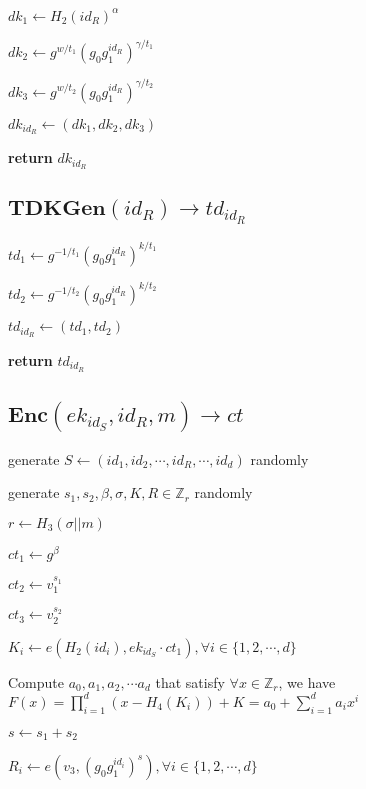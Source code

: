 \documentclass[a4paper]{article}
\begin{document}
$\textit{dk}_1 \gets H_2(\textit{id}_R)^\alpha$

$\textit{dk}_2 \gets g^{w / t_1} (g_0 g_1^{\textit{id}_R})^{\gamma / t_1}$

$\textit{dk}_3 \gets g^{w / t_2} (g_0 g_1^{\textit{id}_R})^{\gamma / t_2}$

$\textit{dk}_{\textit{id}_R} \gets (\textit{dk}_1, \textit{dk}_2, \textit{dk}_3)$

\textbf{return} $\textit{dk}_{\textit{id}_R}$

\subsection{$\textbf{TDKGen}(\textit{id}_R) \rightarrow \textit{td}_{\textit{id}_R}$}

$\textit{td}_1 \gets g^{-1 / t_1} (g_0 g_1^{\textit{id}_R})^{k / t_1}$

$\textit{td}_2 \gets g^{-1 / t_2} (g_0 g_1^{\textit{id}_R})^{k / t_2}$

$\textit{td}_{\textit{id}_R} \gets (\textit{td}_1, \textit{td}_2)$

\textbf{return} $\textit{td}_{\textit{id}_R}$

\subsection{$\textbf{Enc}(\textit{ek}_{\textit{id}_S}, \textit{id}_R, m) \rightarrow \textit{ct}$}

generate $S \gets (\textit{id}_1, \textit{id}_2, \cdots, \textit{id}_R, \cdots, \textit{id}_d)$ randomly

generate $s_1, s_2, \beta, \sigma, K, R \in \mathbb{Z}_r$ randomly

$r \gets H_3(\sigma || m)$

$\textit{ct}_1 \gets g^\beta$

$\textit{ct}_2 \gets v_1^{s_1}$

$\textit{ct}_3 \gets v_2^{s_2}$

$K_i \gets e(H_2(\textit{id}_i), ek_{\textit{id}_S} \cdot \textit{ct}_1), \forall i \in \{1, 2, \cdots, d\}$

Compute $a_0, a_1, a_2, \cdots a_d$ that satisfy $\forall x \in \mathbb{Z}_r$, we have $F(x) = \prod\limits_{i = 1}^d (x - H_4(K_i)) + K = a_0 + \sum\limits_{i = 1}^d a_i x^i$

$s \gets s_1 + s_2$

$R_i \gets e(v_3, (g_0 g_1^{\textit{id}_i})^s), \forall i \in \{1, 2, \cdots, d\}$
\end{document}
